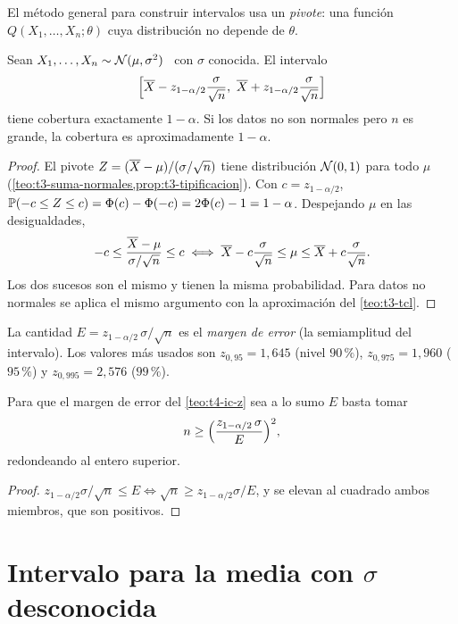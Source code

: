 El método general para construir intervalos usa un \emph{pivote}: una función $Q(X_1,\dots,X_n;\theta)$ cuya distribución no depende de $\theta$.

\begin{teorema}\label{teo:t4-ic-z}
Sean $X_1,\dots,X_n\sim\mathcal{N}(\mu,\sigma^{2})$ \iid\ con $\sigma$ conocida. El intervalo
\[
\Bigl[\overline{X}-z_{1-\alpha/2}\frac{\sigma}{\sqrt n},\ \overline{X}+z_{1-\alpha/2}\frac{\sigma}{\sqrt n}\Bigr]
\]
tiene cobertura exactamente $1-\alpha$. Si los datos no son normales pero $n$ es grande, la cobertura es aproximadamente $1-\alpha$.
\end{teorema}

\begin{proof}
El pivote $Z=(\overline{X}-\mu)/(\sigma/\sqrt n)$ tiene distribución $\mathcal{N}(0,1)$ para todo $\mu$ (\cref{teo:t3-suma-normales,prop:t3-tipificacion}). Con $c=z_{1-\alpha/2}$, $\mathbb{P}(-c\le Z\le c)=\Phi(c)-\Phi(-c)=2\Phi(c)-1=1-\alpha$. Despejando $\mu$ en las desigualdades,
\[
-c\le\frac{\overline{X}-\mu}{\sigma/\sqrt n}\le c\iff\overline{X}-c\frac{\sigma}{\sqrt n}\le\mu\le\overline{X}+c\frac{\sigma}{\sqrt n}.
\]
Los dos sucesos son el mismo y tienen la misma probabilidad. Para datos no normales se aplica el mismo argumento con la aproximación del \cref{teo:t3-tcl}.
\end{proof}

La cantidad $E=z_{1-\alpha/2}\,\sigma/\sqrt n$ es el \emph{margen de error} (la semiamplitud del intervalo). Los valores más usados son $z_{0{,}95}=1{,}645$ (nivel $90\,\%$), $z_{0{,}975}=1{,}960$ ($95\,\%$) y $z_{0{,}995}=2{,}576$ ($99\,\%$).

\begin{corolario}\label{cor:t4-tamano}
Para que el margen de error del \cref{teo:t4-ic-z} sea a lo sumo $E$ basta tomar
\[
n\ge\Bigl(\frac{z_{1-\alpha/2}\,\sigma}{E}\Bigr)^{2},
\]
redondeando al entero superior.
\end{corolario}

\begin{proof}
$z_{1-\alpha/2}\sigma/\sqrt n\le E\iff\sqrt n\ge z_{1-\alpha/2}\sigma/E$, y se elevan al cuadrado ambos miembros, que son positivos.
\end{proof}

\section{Intervalo para la media con \texorpdfstring{$\sigma$}{sigma} desconocida}

